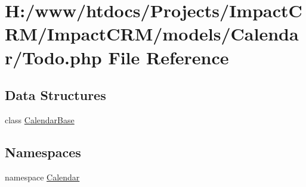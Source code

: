 \hypertarget{Todo_8php}{
\section{H:/www/htdocs/Projects/ImpactCRM/ImpactCRM/models/Calendar/Todo.php File Reference}
\label{Todo_8php}
}
\subsection*{Data Structures}
\begin{DoxyCompactItemize}
\item 
class \hyperlink{classCalendarBase}{CalendarBase}
\end{DoxyCompactItemize}
\subsection*{Namespaces}
\begin{DoxyCompactItemize}
\item 
namespace \hyperlink{namespaceCalendar}{Calendar}
\end{DoxyCompactItemize}
